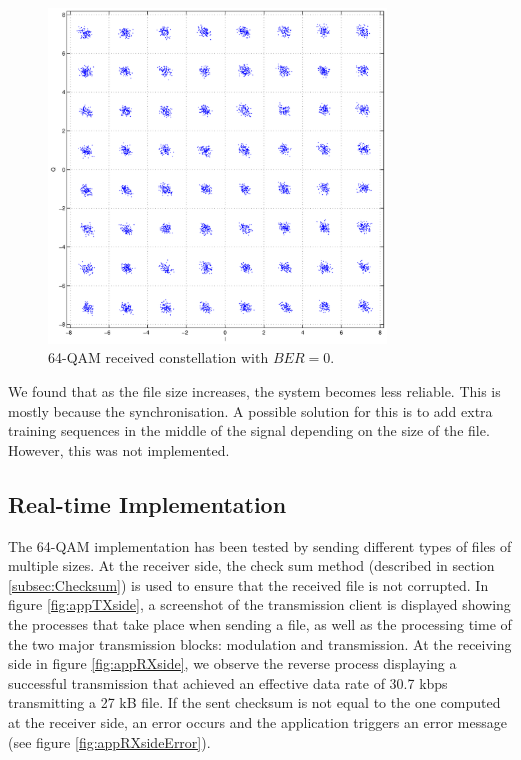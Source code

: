 \documentclass[12pt,a4paper,openright]{report}
\begin{document}
 \begin{figure}[h]
    \centering
     \includegraphics[width=0.8\textwidth]{64QAMscatter.eps}
     \caption[64-QAM received constellation with $BER=0$]{64-QAM received constellation with $BER=0$.}
     \label{fig:64qam_constellation}
    \end{figure}

We found that as the file size increases, the system becomes less reliable. This is mostly because the synchronisation. A possible solution for this is to add extra training sequences in the middle of the signal depending on the size of the file. However, this was not implemented.

 


\subsection{Real-time Implementation}

The 64-QAM implementation has been tested by sending different types of files of multiple sizes. At the receiver side, the check sum method (described in section \ref{subsec:Checksum}) is used to ensure that the received file is not corrupted.  In figure \ref{fig:appTXside}, a screenshot of the transmission client is displayed showing the processes that take place when sending a file, as well as the processing time of the two major transmission blocks: modulation and transmission. At the receiving side in figure \ref{fig:appRXside}, we observe the reverse process displaying a successful transmission that achieved an effective data rate of 30.7 kbps transmitting a 27 kB file. If the sent checksum is not equal to the one computed at the receiver side, an error occurs and the application triggers an error message (see figure \ref{fig:appRXsideError}).
\end{document}
